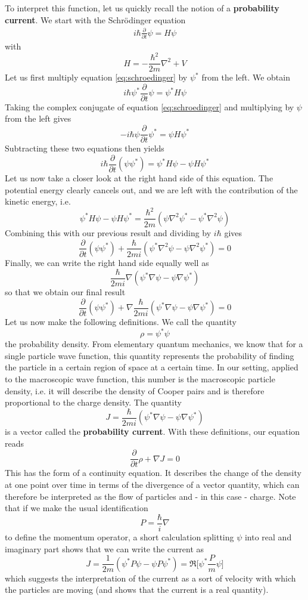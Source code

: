 \documentclass[a4paper, draft]{article}
\theoremstyle{own}
\theoremstyle{remark}
\begin{document}
To interpret this function, let us quickly recall the notion of a {\bf probability current}. We start with the Schr\"odinger equation
\begin{align}\label{eq:schroedinger}
i \hbar \frac{\partial}{\partial t} \psi = H \psi
\end{align}
with
$$
H = - \frac{\hbar^2}{2m} \nabla^2 + V
$$
Let us first multiply equation \eqref{eq:schroedinger} by $\psi^*$ from the left. We obtain
$$
i \hbar \psi^*\frac{\partial}{\partial t} \psi = \psi^* H \psi
$$
Taking the complex conjugate of equation \eqref{eq:schroedinger} and multiplying by $\psi$ from the left gives
$$
-i \hbar \psi\frac{\partial}{\partial t} \psi^* = \psi H \psi^*
$$
Subtracting these two equations then yields
$$
i \hbar \frac{\partial}{\partial t} (\psi \psi^*) = \psi^* H \psi - \psi H \psi^* 
$$
Let us now take a closer look at the right hand side of this equation. The potential energy clearly cancels out, and we are left with the contribution of the kinetic energy, i.e.
$$
\psi^* H \psi - \psi H \psi^*  = \frac{\hbar^2}{2m} (\psi \nabla^2 \psi^* - \psi^* \nabla^2 \psi)
$$
Combining this with our previous result and dividing by $i \hbar$ gives
$$
\frac{\partial}{\partial t} (\psi \psi^*) +
\frac{\hbar}{2mi} (\psi^* \nabla^2 \psi - \psi \nabla^2 \psi^*) = 0
$$
Finally, we can write the right hand side equally well as
$$
\frac{\hbar}{2mi} \nabla (\psi^* \nabla \psi - \psi \nabla \psi^*)
$$
so that we obtain our final result
$$
\frac{\partial}{\partial t} (\psi \psi^*) + \nabla 
\frac{\hbar}{2mi} (\psi^* \nabla \psi - \psi \nabla \psi^*) = 0
$$
Let us now make the following definitions. We call the quantity
$$
\rho = \psi^* \psi
$$
the probability density. From elementary quantum mechanics, we know that for a single particle wave function, this quantity represents the probability of finding the particle in a certain region of space at a certain time. In our setting, applied to the macroscopic wave function, this number is the macroscopic particle density, i.e. it will describe the density of Cooper pairs and is therefore proportional to the charge density. The quantity
$$
J = \frac{\hbar}{2mi} (\psi^* \nabla \psi - \psi \nabla \psi^*)
$$
is a vector called the {\bf probability current}. With these definitions, our equation reads
$$
\frac{\partial}{\partial t} \rho + \nabla J =0
$$
This has the form of a continuity equation. It describes the change of the density at one point over time in terms of the divergence of a vector quantity, which can therefore be interpreted as the flow of particles and - in this case - charge.  Note that if we make the usual identification
$$
P = \frac{\hbar}{i} \nabla
$$
to define the momentum operator, a short calculation splitting $\psi$ into real and imaginary part shows that we can write the current as
$$
J = \frac{1}{2m} (\psi^* P \psi - \psi P \psi^*) = \Re \big[ 
\psi^* \frac{P}{m}  \psi \big]
$$
which suggests the interpretation of the current as a sort of velocity with which the particles are moving (and shows that the current is a real quantity).
\end{document}
